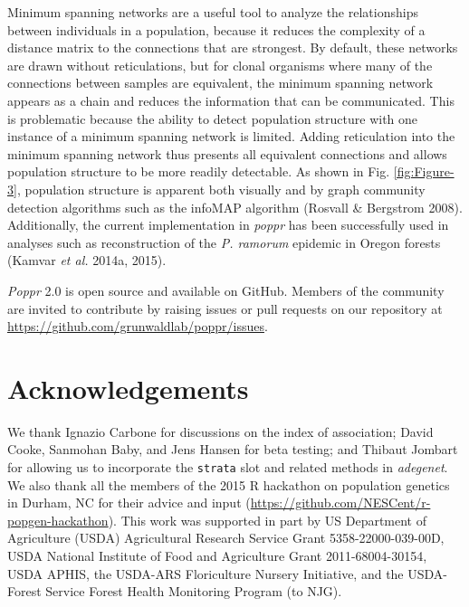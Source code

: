 \documentclass[double,12pt]{beavtex}
\begin{document}
  Minimum spanning networks are a useful tool to analyze the relationships
  between individuals in a population, because it reduces the complexity
  of a distance matrix to the connections that are strongest. By default,
  these networks are drawn without reticulations, but for clonal organisms
  where many of the connections between samples are equivalent, the
  minimum spanning network appears as a chain and reduces the information
  that can be communicated. This is problematic because the ability to
  detect population structure with one instance of a minimum spanning
  network is limited. Adding reticulation into the minimum spanning
  network thus presents all equivalent connections and allows population
  structure to be more readily detectable. As shown in Fig.
  \ref{fig:Figure-3}, population structure is apparent both visually and
  by graph community detection algorithms such as the infoMAP algorithm
  (Rosvall \& Bergstrom 2008). Additionally, the current implementation in
  \emph{poppr} has been successfully used in analyses such as
  reconstruction of the \emph{P. ramorum} epidemic in Oregon forests
  (Kamvar \emph{et al.} 2014a, 2015).
  
  \emph{Poppr} 2.0 is open source and available on GitHub. Members of the
  community are invited to contribute by raising issues or pull requests
  on our repository at \url{https://github.com/grunwaldlab/poppr/issues}.
  
  \newpage
  
  \section{Acknowledgements}\label{acknowledgements-1}
  
  We thank Ignazio Carbone for discussions on the index of association;
  David Cooke, Sanmohan Baby, and Jens Hansen for beta testing; and
  Thibaut Jombart for allowing us to incorporate the \texttt{strata} slot
  and related methods in \emph{adegenet}. We also thank all the members of
  the 2015 R hackathon on population genetics in Durham, NC for their
  advice and input (\url{https://github.com/NESCent/r-popgen-hackathon}).
  This work was supported in part by US Department of Agriculture (USDA)
  Agricultural Research Service Grant 5358-22000-039-00D, USDA National
  Institute of Food and Agriculture Grant 2011-68004-30154, USDA APHIS,
  the USDA-ARS Floriculture Nursery Initiative, and the USDA-Forest
  Service Forest Health Monitoring Program (to NJG).
  
\end{document}
